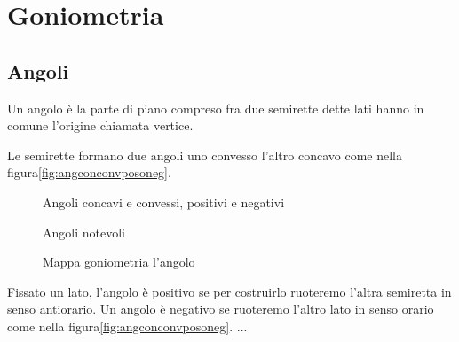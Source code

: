 \chapter{Goniometria}
\label{sec:GONIOMETRIA}
\minitoc
\mtcskip                                %
\minilof                                %
\mtcskip                                %
\minilot
\FloatBarrier
\section{Angoli}
\label{sec:gonioang}
\begin{definizione}[Angolo]
Un angolo è la parte di piano compreso fra due semirette dette lati hanno in comune l'origine chiamata vertice.
\end{definizione}

Le  semirette formano due angoli  uno convesso l'altro concavo come nella figura\nobs\vref{fig:angconconvposoneg}. 
\begin{figure} %
	\centering

	\caption{Angoli concavi e convessi, positivi e negativi}
	\label{fig:angconconvposoneg}
\end{figure}
\begin{figure} %
	\centering

	\caption{Angoli notevoli}
	\label{fig:Angolorettoposneggonio}
\end{figure}
\begin{figure}

	\caption{Mappa goniometria l'angolo}
	\label{fig:MappaGonometria1}
\end{figure}
\begin{definizione}
	Fissato un lato, l'angolo è  positivo  se per costruirlo ruoteremo l'altra semiretta in senso antiorario.  Un angolo è negativo se ruoteremo l'altro lato in senso orario come nella figura\nobs\vref{fig:angconconvposoneg}. ...
\end{definizione}

